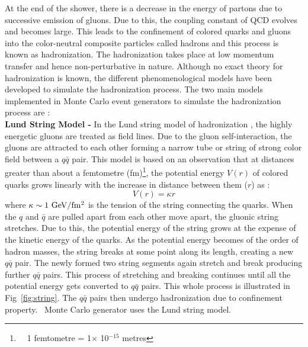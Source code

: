 At the end of the shower, there is a decrease in the energy of partons due to successive emission of gluons. Due to this, the coupling constant of QCD \alps evolves and becomes large. This leads to the confinement of colored quarks and gluons into the color-neutral composite particles called hadrons and this process is known as hadronization. The hadronization takes place at low momentum transfer and hence non-perturbative in nature. Although no exact theory for hadronization is known, the different phenomenological models have been developed to simulate the hadronization process. The two main models implemented in Monte Carlo event generators to simulate the hadronization process are : \\\newline
{\bf Lund String Model -} In the Lund string model of hadronization \cite{Andersson:1998tv}, the highly energetic gluons are treated as field lines. Due to the gluon self-interaction, the gluons are attracted to each other forming a narrow tube or string of strong color field between a $q\bar{q}$ pair. This model is based on an observation that at distances greater than about a femtometre (fm)\footnote{~~1 femtometre = 1$\times$ 10$^{-15}$ metres}, the potential energy $V(r)$ of colored quarks grows linearly with the increase in distance between them ($r$) as :
\begin{equation}
V(r) = \kappa r
\end{equation}
where $\kappa \sim 1~{\rm GeV/fm^2}$ is the tension of the string connecting the quarks. When the $q$ and $\bar{q}$ are pulled apart from each other move apart, the gluonic string stretches. Due to this, the potential energy of the string grows at the expense of the kinetic energy of the quarks. As the potential energy becomes of the order of hadron masses, the string breaks at some point along its length, creating a new $q\bar{q}$ pair. The newly formed two string segments again stretch and break producing further $q\bar{q}$ pairs. This process of stretching and breaking continues until all the potential energy gets converted to $q\bar{q}$ pairs. This whole process is illustrated in Fig~\ref{fig:string}. The $q\bar{q}$ pairs then undergo hadronization due to confinement property. \PYTHIA~Monte Carlo generator uses the Lund string model. 
